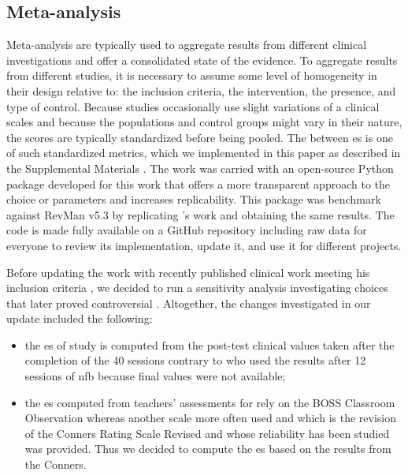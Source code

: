 \subsection{Meta-analysis}

Meta-analysis are typically used to aggregate results from different clinical investigations and offer a consolidated 
state of the evidence. To aggregate results from different studies, it is necessary to assume some level of homogeneity 
in their design relative to: the inclusion criteria, the intervention, the presence, and type of control.
Because studies occasionally use slight variations of a clinical scales and because the populations and 
control groups might vary in their nature, the scores are typically standardized before being pooled. 
The between \gls{es} is one of such standardized metrics, which we implemented in this paper as described 
in the Supplemental Materials \citep{add exact reference here}. The work was carried with an open-source 
Python package developed for this work that offers a more transparent approach to the choice or parameters 
and increases replicability. This package was benchmark against RevMan v5.3 \citep{RevMan}
by replicating \citet{Cortese2016}'s work and obtaining the same results. The code is made fully available 
on a GitHub repository \citep{Bussalb2018} including raw data for everyone to review its implementation, update it, and 
use it for different projects. 
 
Before updating the \citet{Cortese2016} work with recently published clinical work meeting his inclusion criteria 
\citep{Strehl2017, Baumeister2016}, we decided to run a sensitivity analysis investigating choices that later 
proved controversial \citep{Micoulaud2016}. Altogether, the changes investigated in our update included the following:
\begin{itemize}
\item the \gls{es} of \citeauthor{Arnold2014} study is computed from the post-test clinical values taken after the completion of the 40 sessions 
contrary to \citet{Cortese2016} who used the results after 12 sessions of \gls{nfb} because final values were not available;
\item the \gls{es} computed from teachers' assessments for \citet{Steiner2014} rely on the BOSS Classroom Observation \citep{Shapiro2010} whereas 
another scale more often used \citep{Christiansen2014, Bluschke2016} and which is the revision of the Conners Rating Scale Revised \citep{Conners1998} 
and whose reliability has been studied \citep{Collett2003} was provided. Thus we decided to compute the \gls{es} based on the results from the Conners.  
\end{itemize} 

